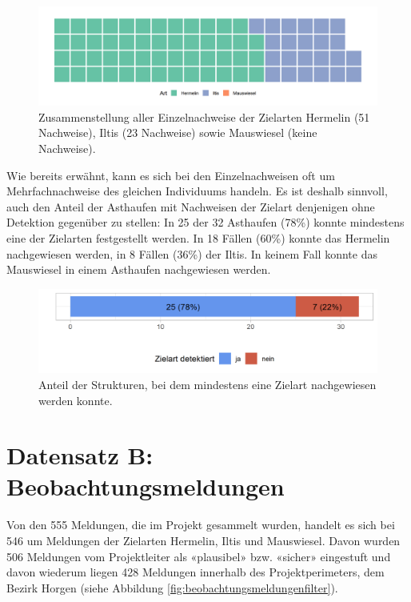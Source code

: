 \documentclass[
  oneside]{scrbook}
\begin{document}
\begin{figure}
\includegraphics[width=1\linewidth]{images/wirkungskontrolle_spontan_einzelnachweise_waffle} \caption{Zusammenstellung aller Einzelnachweise der Zielarten Hermelin (51 Nachweise), Iltis (23 Nachweise) sowie Mauswiesel (keine Nachweise).}\label{fig:wirkungskontrollespontaneinzelnachweisewaffle}
\end{figure}

Wie bereits erwähnt, kann es sich bei den Einzelnachweisen oft um Mehrfachnachweise des gleichen Individuums handeln. Es ist deshalb sinnvoll, auch den Anteil der Asthaufen mit Nachweisen der Zielart denjenigen ohne Detektion gegenüber zu stellen: In 25 der 32 Asthaufen (78\%) konnte mindestens eine der Zielarten festgestellt werden. In 18 Fällen (60\%) konnte das Hermelin nachgewiesen werden, in 8 Fällen (36\%) der Iltis. In keinem Fall konnte das Mauswiesel in einem Asthaufen nachgewiesen werden.



\begin{figure}
\includegraphics[width=1\linewidth]{images/wirkungskontrolle_spontan_strukturen_mit_zielart} \caption{Anteil der Strukturen, bei dem mindestens eine Zielart nachgewiesen werden konnte.}\label{fig:wirkungskontrollespontanstrukturenmitzielart}
\end{figure}

\hypertarget{datensatz-b-beobachtungsmeldungen-1}{%
\section{Datensatz B: Beobachtungsmeldungen}\label{datensatz-b-beobachtungsmeldungen-1}}

Von den 555 Meldungen, die im Projekt gesammelt wurden, handelt es sich bei 546 um Meldungen der Zielarten Hermelin, Iltis und Mauswiesel. Davon wurden 506 Meldungen vom Projektleiter als «plausibel» bzw. «sicher» eingestuft und davon wiederum liegen 428 Meldungen innerhalb des Projektperimeters, dem Bezirk Horgen (siehe Abbildung \ref{fig:beobachtungsmeldungenfilter}).
\end{document}
